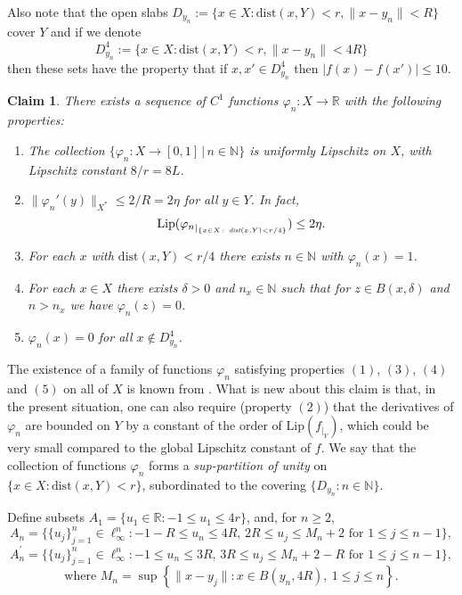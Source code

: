 \documentclass[11pt]{amsproc}%
\theoremstyle{plain}
\newtheorem{claim}{Claim}
\numberwithin{equation}{section}
\begin{document}
Also note that the open slabs $D_{y_n}:=\{x\in X: \textrm{dist}(x,
Y)< r, \|x-y_n\|< R\}$ cover $Y$ and if we denote
$$D_{y_n}^{4}:=\{x\in X: \textrm{dist}(x, Y)< r, \|x-y_n\|< 4R\}$$
then these sets have the property that if $x, x'\in D_{y_n}^4$
then $|f(x)-f(x')|\leq 10$.


\begin{claim}
\label{construction of the sup partition of unity} There exists a
sequence of $C^1$ functions $\varphi_{n}
:X\to\mathbb{R}$ with the following properties:
\begin{enumerate}
\item The collection $\{\varphi_{n} :X\to[0,1] \, | \, n\in\mathbb{N}\}$ is
uniformly Lipschitz on $X$, with Lipschitz constant $8/r=8L$.
\item $\|{\varphi_n}'(y)\|_{X^{*}}\leq 2/R=2\eta$ for all $y\in Y$. In fact,
$$
\textrm{Lip}({\varphi_{n}}_{|_{\{x\in X \, : \, \text{ \em
dist}(x, Y)<r/4\}}})\leq 2\eta.$$
\item For each $x$ with $\textrm{dist}(x,Y)<r/4$ there exists $n\in\mathbb{N}$ with
$\varphi_{n}(x)=1$.
\item For each $x\in X$ there exists $\delta>0$ and $n_{x}\in\mathbb{N}$ such
that for $z\in B(x, \delta)$ and $n>n_{x}$ we have $\varphi_{n}
(z)=0$.
\item $\varphi_{n}(x)=0$ for all $x\notin D_{y_n}^{4}$.
\end{enumerate}
\end{claim}
The existence of a family of functions $\varphi_n$ satisfying
properties $(1), \, (3), \, (4)$ and $(5)$ on all of $X$ is known
from \cite{F, HJ}. What is new about this claim is that, in the
present situation, one can also require (property $(2)$) that the
derivatives of $\varphi_n$ are bounded on $Y$ by a constant of the
order of $\textrm{Lip}(f_{|_Y})$, which could be very small
compared to the global Lipschitz constant of $f$. We say that the
collection of functions $\varphi_n$ forms a {\em sup-partition of
unity} on $\{x\in X: \textrm{dist}(x, Y)<r\}$, subordinated to the
covering $\{D_{y_n}: n\in\mathbb{N}\}$.


\medskip

 Define subsets
$A_{1}=\{u_{1}\in\mathbb{R}: -1\leq u_{1}\leq 4r\}$, and, for
$n\geq2$,
\[
A_{n} =\{\{u_{j}\}_{j=1}^{n}\in\ell^{n}_{\infty} : -1-R\leq
u_{n}\leq4R, \, 2R\leq u_{j}\leq M_{n}+2 \text{ for } 1\leq j\leq
n-1\},
\]
\[
A^{\prime}_{n}=\{\{u_{j}\}_{j=1}^{n}\in\ell^{n}_{\infty} : -1\leq u_{n}%
\leq3R, \, 3R\leq u_{j}\leq M_{n}+2-R \text{ for } 1\leq j\leq
n-1\},
\]
\[
\text{where } M_{n}=\sup\left\{ \| x-y_{j}\| :x\in B(y_{n}, 4R),\
1\leq j\leq n\right\} .
\]
\end{document}
